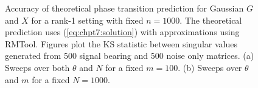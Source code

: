 \begin{figure}
\begin{center}
  \caption{Accuracy of theoretical phase transition prediction for Gaussian $G$ and $X$
    for a rank-1 setting with fixed $n=1000$. The theoretical prediction uses
    (\ref{eq:chpt7:solution}) with approximations using RMTool. Figures plot the KS
    statistic between singular values generated from 500 signal bearing and 500 noise only
    matrices. (a) Sweeps over both $\theta$ and $N$ for a fixed $m=100$. (b) Sweeps over
    $\theta$ and $m$ for a fixed $N=1000$.}
  \label{fig:chpt7:gauss}
\end{center}
\end{figure}

